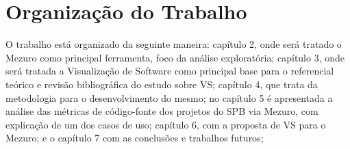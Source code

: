 \section{Organização do Trabalho}


O trabalho está organizado da seguinte maneira: capítulo 2, onde será tratado o
Mezuro como principal ferramenta, foco da análise exploratória; capítulo 3, onde
será tratada a Visualização de Software como principal base para o
referencial teórico e revisão bibliográfica do estudo sobre VS; capítulo 4,
que trata da metodologia para o desenvolvimento do mesmo; no capítulo 5 é
apresentada a análise das métricas de código-fonte dos projetos do SPB via
Mezuro, com explicação de um dos casos de uso; capítulo 6, com a proposta de VS
para o Mezuro; e o capítulo 7 com as conclusões e trabalhos futuros;
